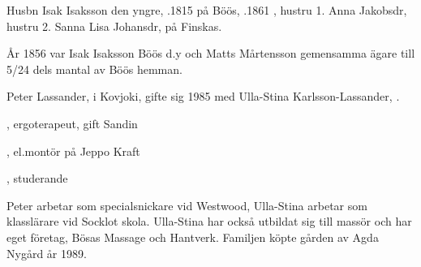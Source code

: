 %
Husbn Isak Isaksson den yngre, .1815 på Böös, .1861 , hustru 1. Anna Jakobsdr, hustru 2. Sanna Lisa Johansdr,  på Finskas.
\begin{jhchildren}
  \item {}
  \item {}
  \item {}
  \item {}
  \item {}
  \item {}
  \item {}
  \item {}
\end{jhchildren}
År 1856 var Isak Isaksson Böös d.y och Matts Mårtensson gemensamma ägare till 5/24 dels mantal av Böös hemman.



%



%
Peter Lassander,  i Kovjoki, gifte sig 1985 med Ulla-Stina Karlsson-Lassander, .
\begin{jhchildren}
  \item {}, ergoterapeut, gift Sandin
  \item {}, el.montör på Jeppo Kraft
  \item {}, studerande
\end{jhchildren}

Peter arbetar som specialsnickare vid Westwood, Ulla-Stina arbetar som klasslärare vid Socklot skola. Ulla-Stina har också utbildat sig till massör och har eget företag, Bösas Massage och Hantverk. Familjen köpte gården av Agda Nygård år 1989.


